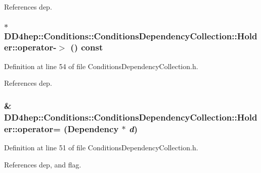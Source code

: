 References dep.\hypertarget{struct_d_d4hep_1_1_conditions_1_1_conditions_dependency_collection_1_1_holder_a32d917579447f88e43ea7314f4338e42}{
\subsubsection[{operator-\/$>$}]{$\ast$ DD4hep::Conditions::ConditionsDependencyCollection::Holder::operator-\/$>$ () const}}
\label{struct_d_d4hep_1_1_conditions_1_1_conditions_dependency_collection_1_1_holder_a32d917579447f88e43ea7314f4338e42}


Definition at line 54 of file ConditionsDependencyCollection.h.

References dep.\hypertarget{struct_d_d4hep_1_1_conditions_1_1_conditions_dependency_collection_1_1_holder_a2a2c20e8415f2366ff083542b73a225a}{
\subsubsection[{operator=}]{\& DD4hep::Conditions::ConditionsDependencyCollection::Holder::operator= ({\bf Dependency} $\ast$ {\em d})}}
\label{struct_d_d4hep_1_1_conditions_1_1_conditions_dependency_collection_1_1_holder_a2a2c20e8415f2366ff083542b73a225a}


Definition at line 51 of file ConditionsDependencyCollection.h.

References dep, and flag.

